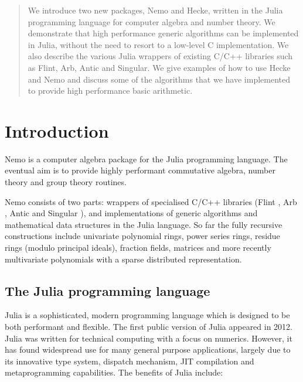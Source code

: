 \documentclass{sig-alternate-05-2015}
\begin{document}
\begin{abstract}
We introduce two new packages, Nemo and Hecke, written in the Julia programming language
for computer algebra and number theory.
We demonstrate that high performance generic
algorithms can be implemented in Julia, without the need to resort to a low-level C
implementation. We also describe the various Julia wrappers of existing C/C++ libraries
such as Flint, Arb, Antic and Singular. We give examples of how to use Hecke and Nemo and discuss
some of the algorithms that we have implemented to provide high performance basic
arithmetic.
\end{abstract}


\section{Introduction}

Nemo is a computer algebra package for the Julia programming language. The eventual aim is
to provide highly performant commutative algebra, number theory and group theory routines.

Nemo consists of two parts: wrappers of specialised C/C++
libraries (Flint \cite{flint}, Arb \cite{arb}, Antic \cite{antic} and Singular
\cite{singular}), and
implementations of generic algorithms and mathematical data
structures in the Julia language. So far the fully recursive constructions include
univariate polynomial rings, power series rings, residue rings (modulo principal ideals),
fraction fields, matrices and more recently multivariate polynomials with a sparse
distributed representation.

\subsection{The Julia programming language}

Julia \cite{julia} is a sophisticated, modern programming language which is designed
to be both performant and flexible.
The first public version of Julia appeared in 2012. 
Julia was written for technical computing with a
focus on numerics. However, it has found widespread use for many general purpose
applications, largely due to its innovative type system, dispatch mechanism, JIT
compilation and metaprogramming capabilities.
The benefits of Julia include:
\end{document}
